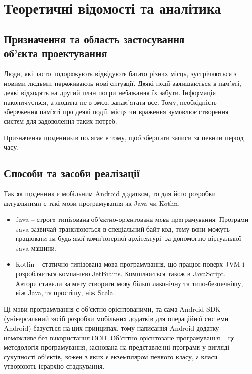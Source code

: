 \documentclass[../main.tex]{subfiles}
\begin{document}
\chapter{Теоретичні відомості та аналітика}

\section{Призначення та область застосування \\об'єкта проектування}

Люди, які часто подорожують відвідують багато різних місць, зустрічаються з новими людьми, переживають нові ситуації. Деякі події залишаються в пам'яті, деякі відходять на другий план попри небажання їх забути. Інформація накопичується, а людина не в змозі запам'ятати все. Тому, необхідність збереження пам'яті про деякі події, місця чи враження зумовлює створення систем для задоволення таких потреб.

Призначення щоденників полягає в тому, щоб зберігати записи за певний період часу. 


\section{Способи та засоби реалізації}

Так як щоденник є мобільним Android додатком, то для його розробки актуальними є такі мови програмування як Java чи Kotlin. 

\begin{itemize}
    \item Java – строго типізована об'єктно-орієнтована мова програмування. Програми Java зазвичай транслюються в спеціальний байт-код, тому вони можуть працювати на будь-якої комп'ютерної архітектурі, за допомогою віртуальної Java-машини.
    \item Kotlin – статично типізована мова програмування, що працює поверх JVM і розробляється компанією JetBrains. Компілюється також в JavaScript. Автори ставили за мету створити мову більш лаконічну та типо-безпечнішу, ніж Java, та простішу, ніж Scala.
\end{itemize}

Ці мови програмування є об'єктно-орієнтованими, та сама Android SDK (універсальний засіб розробки мобільних додатків для операційної системи Android) базується на цих принципах, тому написання Android-додатку неможливе без використання ООП. Об'єктно-орієнтоване програмування – це методологія програмування, заснована на представленні програми у вигляді сукупності об'єктів, кожен з яких є екземпляром певного класу, а класи утворюють ієрархію спадкування.
\end{document}
